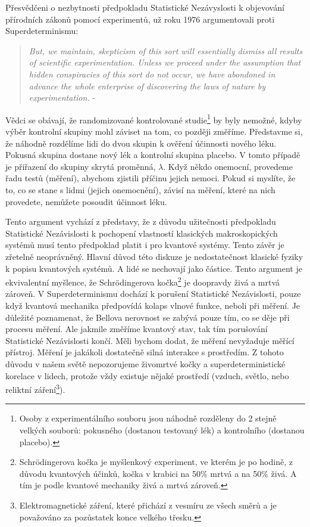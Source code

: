 Přesvědčeni o nezbytnosti předpokladu Statistické Nezávyslosti k objevování přírodních zákonů pomocí experimentů, \citeauthor{ArgSciMeth:1} už roku 1976 argumentovali proti Superdeterminismu:
\begin{quote}
    \emph{But, we maintain, skepticism of this sort will essentially dismiss all results of scientific experimentation. Unless we proceed under the assumption that hidden conspiracies of this sort do not occur, we have abondoned in advance the whole enterprise of discovering the laws of nature by experimentation.} - \cite{ArgSciMeth:1}
\end{quote}

Vědci se obávají, že randomizované kontrolované studie\footnote[14]{Osoby z experimentálního souboru jsou náhodně rozděleny do 2 stejně velkých souborů: pokusného (dostanou testovaný lék) a kontrolního (dostanou placebo).} by byly nemožné, kdyby výběr kontrolní skupiny mohl záviset na tom, co později změříme. Představme si, že náhodně rozdělíme lidi do dvou skupin k ověření účinnosti nového léku. Pokusná skupina dostane nový lék a kontrolní skupina placebo. V tomto případě je přiřazení do skupiny skrytá proměnná, $\lambda$. Když někdo onemocní, provedeme řadu testů (měření), abychom zjistili příčinu jejich nemoci. Pokud si myslíte, že to, co se stane s lidmi (jejich onemocnění), závisí na měření, které na nich provedete, nemůžete posoudit účinnost léku.

Tento argument vychází z představy, že z důvodu užitečnosti předpokladu Statistické Nezávislosti k pochopení vlastností klasických makroskopických systémů musí tento předpoklad platit i pro kvantové systémy. Tento závěr je zřetelně neoprávněný. Hlavní důvod této diskuze je nedostatečnost klasické fyziky k popisu kvantových systémů. A lidé se nechovají jako částice. Tento argument je ekvivalentní myšlence, že Schrödingerova kočka\footnote[15]{Schrödingerova kočka je myšlenkový experiment, ve kterém je po hodině, z důvodu kvantových účinků, kočka v krabici na 50\% mrtvá a na 50\% živá. A tím je podle kvantové mechaniky živá a mrtvá zároveň.} je doopravdy živá a mrtvá zároveň. V Superdeterminismu dochází k porušení Statistické Nezávislosti, pouze když kvantová mechanika předpovídá kolaps vlnové funkce, neboli při měření. Je důležité poznamenat, že Bellova nerovnost se zabývá pouze tím, co se děje při procesu měření. Ale jakmile změříme kvantový stav, tak tím porušování Statistické Nezávislosti končí. Měli bychom dodat, že měření nevyžaduje měřící přístroj. Měření je jakákoli dostatečně silná interakce s prostředím. Z tohoto důvodu v našem světě nepozorujeme živomrtvé kočky a superdeterministické korelace v lidech, protože vždy existuje nějaké prostředí (vzduch, světlo, nebo reliktní záření\footnote[16]{Elektromagnetické záření, které přichází z vesmíru ze všech směrů a je považováno za pozůstatek konce velkého třesku.}).